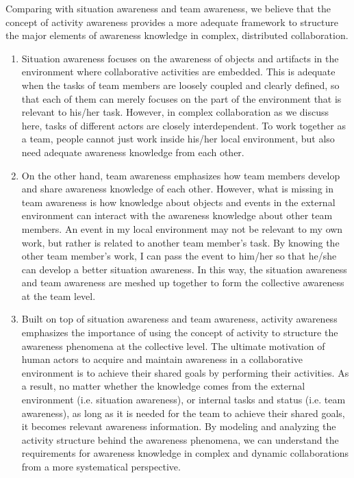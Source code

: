 Comparing with situation awareness and team awareness, we believe that the concept of activity awareness provides a more adequate framework to structure the major elements of awareness knowledge in complex, distributed collaboration. 
\begin{enumerate}
   \item Situation awareness focuses on the awareness of objects and artifacts in the environment where collaborative activities are embedded. This is adequate when the tasks of team members are loosely coupled and clearly defined, so that each of them can merely focuses on the part of the environment that is relevant to his/her task. However, in complex collaboration as we discuss here, tasks of different actors are closely interdependent. To work together as a team, people cannot just work inside his/her local environment, but also need adequate awareness knowledge from each other.
   \item On the other hand, team awareness emphasizes how team members develop and share awareness knowledge of each other. However, what is missing in team awareness is how knowledge about objects and events in the external environment can interact with the awareness knowledge about other team members. An event in my local environment may not be relevant to my own work, but rather is related to another team member's task. By knowing the other team member's work, I can pass the event to him/her so that he/she can develop a better situation awareness. In this way, the situation awareness and team awareness are meshed up together to form the collective awareness at the team level. 
   \item Built on top of situation awareness and team awareness, activity awareness emphasizes the importance of using the concept of activity to structure the awareness phenomena at the collective level. The ultimate motivation of human actors to acquire and maintain awareness in a collaborative environment is to achieve their shared goals by performing their activities. As a result, no matter whether the knowledge comes from the external environment (i.e. situation awareness), or internal tasks and status (i.e. team awareness), as long as it is needed for the team to achieve their shared goals, it becomes relevant awareness information. By modeling and analyzing the activity structure behind the awareness phenomena, we can understand the requirements for awareness knowledge in complex and dynamic collaborations from a more systematical perspective.
\end{enumerate}

